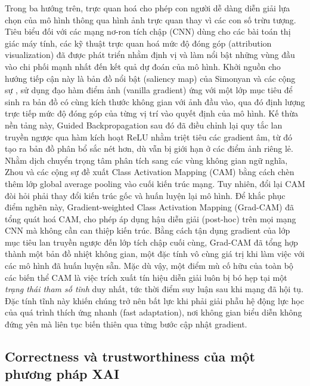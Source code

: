 Trong ba hướng trên, trực quan hoá cho phép con người dễ dàng diễn giải lựa chọn của mô hình thông qua hình ảnh trực quan thay vì các con số trừu tượng. Tiêu biểu đối với các mạng nơ-ron tích chập (CNN) dùng cho các bài toán thị giác máy tính, các kỹ thuật trực quan hoá mức độ đóng góp (attribution visualization) đã được phát triển nhằm định vị và làm nổi bật những vùng đầu vào chi phối mạnh nhất đến kết quả dự đoán của mô hình. Khởi nguồn cho hướng tiếp cận này là bản đồ nổi bật (saliency map) của Simonyan và các cộng sự \cite{simonyan2014visualising}, sử dụng đạo hàm điểm ảnh (vanilla gradient) ứng với một lớp mục tiêu để sinh ra bản đồ có cùng kích thước không gian với ảnh đầu vào, qua đó định lượng trực tiếp mức độ đóng góp của từng vị trí vào quyết định của mô hình. Kế thừa nền tảng này, Guided Backpropagation \cite{springenberg2014striving} sau đó đã điều chỉnh lại quy tắc lan truyền ngược qua hàm kích hoạt ReLU nhằm triệt tiêu các gradient âm, từ đó tạo ra bản đồ phân bổ sắc nét hơn, dù vẫn bị giới hạn ở các điểm ảnh riêng lẻ. Nhằm dịch chuyển trọng tâm phân tích sang các vùng không gian ngữ nghĩa, Zhou và các cộng sự \cite{zhou2016learning} đề xuất Class Activation Mapping (CAM) bằng cách chèn thêm lớp global average pooling vào cuối kiến trúc mạng. Tuy nhiên, đổi lại CAM đòi hỏi phải thay đổi kiến trúc gốc và huấn luyện lại mô hình. Để khắc phục điểm nghẽn này, Gradient-weighted Class Activation Mapping (Grad-CAM) \cite{selvaraju2020grad} đã tổng quát hoá CAM, cho phép áp dụng hậu diễn giải (post-hoc) trên mọi mạng CNN mà không cần can thiệp kiến trúc. Bằng cách tận dụng gradient của lớp mục tiêu lan truyền ngược đến lớp tích chập cuối cùng, Grad-CAM đã tổng hợp thành một bản đồ nhiệt không gian, một đặc tính vô cùng giá trị khi làm việc với các mô hình đã huấn luyện sẵn. Mặc dù vậy, một điểm mù cố hữu của toàn bộ các biến thể CAM là việc trích xuất tín hiệu diễn giải luôn bị bó hẹp tại một \emph{trạng thái tham số tĩnh} duy nhất, tức thời điểm suy luận sau khi mạng đã hội tụ. Đặc tính tĩnh này khiến chúng trở nên bất lực khi phải giải phẫu hệ động lực học của quá trình thích ứng nhanh (fast adaptation), nơi không gian biểu diễn không đứng yên mà liên tục biến thiên qua từng bước cập nhật gradient.

\subsection{Correctness và trustworthiness của một phương pháp XAI}

